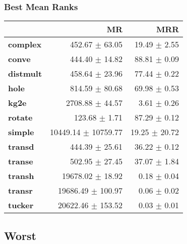 \documentclass{article}
\begin{document}
    \subsubsection{Best Mean Ranks}
    \begin{center}
    \begin{tabular}{lrr}
\toprule
{} &                   MR &            MRR \\
\midrule
\textbf{complex } &       452.67 $\pm$ 63.05 &   19.49 $\pm$ 2.55 \\
\textbf{conve   } &       444.40 $\pm$ 14.82 &   88.81 $\pm$ 0.09 \\
\textbf{distmult} &       458.64 $\pm$ 23.96 &   77.44 $\pm$ 0.22 \\
\textbf{hole    } &       814.59 $\pm$ 80.68 &   69.98 $\pm$ 0.53 \\
\textbf{kg2e    } &      2708.88 $\pm$ 44.57 &    3.61 $\pm$ 0.26 \\
\textbf{rotate  } &        123.68 $\pm$ 1.71 &   87.29 $\pm$ 0.12 \\
\textbf{simple  } &  10449.14 $\pm$ 10759.77 &  19.25 $\pm$ 20.72 \\
\textbf{transd  } &       444.39 $\pm$ 25.61 &   36.22 $\pm$ 0.12 \\
\textbf{transe  } &       502.95 $\pm$ 27.45 &   37.07 $\pm$ 1.84 \\
\textbf{transh  } &     19678.02 $\pm$ 18.92 &    0.18 $\pm$ 0.04 \\
\textbf{transr  } &    19686.49 $\pm$ 100.97 &    0.06 $\pm$ 0.02 \\
\textbf{tucker  } &    20622.46 $\pm$ 153.52 &    0.03 $\pm$ 0.01 \\
\bottomrule
\end{tabular}

    \end{center}
    \subsection{Worst}
\end{document}
